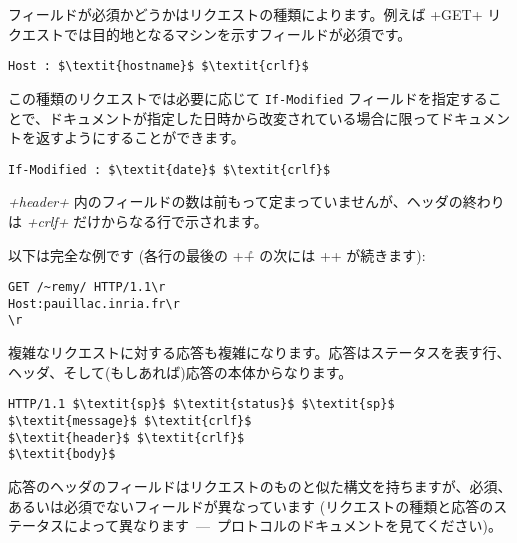 フィールドが必須かどうかはリクエストの種類によります。例えば \ml+GET+ リクエストでは目的地となるマシンを示すフィールドが必須です。
%
\begin{lstlisting}
Host : $\textit{hostname}$ $\textit{crlf}$
\end{lstlisting}
%
この種類のリクエストでは必要に応じて \texttt{If-Modified} フィールドを指定することで、ドキュメントが指定した日時から改変されている場合に限ってドキュメントを返すようにすることができます。
%
\begin{lstlisting}
If-Modified : $\textit{date}$ $\textit{crlf}$
\end{lstlisting}
%
\textit{\ml+header+} 内のフィールドの数は前もって定まっていませんが、ヘッダの終わりは \textit{\ml+crlf+} だけからなる行で示されます。

以下は完全な例です (各行の最後の \ml+\r+ の次には \ml+\n+ が続きます):
%
\begin{lstlisting}
GET /~remy/ HTTP/1.1\r
Host:pauillac.inria.fr\r
\r
\end{lstlisting}
%
複雑なリクエストに対する応答も複雑になります。応答はステータスを表す行、ヘッダ、そして(もしあれば)応答の本体からなります。
%
\begin{lstlisting}
HTTP/1.1 $\textit{sp}$ $\textit{status}$ $\textit{sp}$ $\textit{message}$ $\textit{crlf}$
$\textit{header}$ $\textit{crlf}$
$\textit{body}$
\end{lstlisting}
%
応答のヘッダのフィールドはリクエストのものと似た構文を持ちますが、必須、あるいは必須でないフィールドが異なっています (リクエストの種類と応答のステータスによって異なります~---~プロトコルのドキュメントを見てください)。


